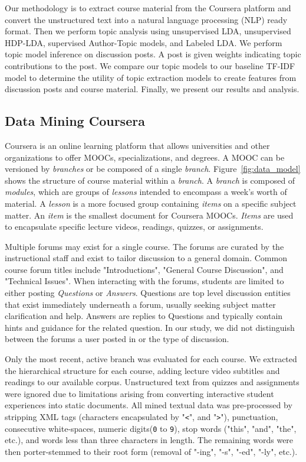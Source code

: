 \documentclass[sigconf, nonacm=true]{acmart}
\begin{document}
Our methodology is to extract course material from the Coursera platform and convert the unstructured text into a natural language processing (NLP) ready format.
Then we perform topic analysis using unsupervised LDA, unsupervised HDP-LDA, supervised Author-Topic models, and Labeled LDA.
We perform topic model inference on discussion posts. A post is given weights indicating topic contributions to the post.
We compare our topic models to our baseline TF-IDF model to determine the utility of topic extraction models to create features from discussion posts and course material.
Finally, we present our results and analysis.

\subsection{Data Mining Coursera}
Coursera is an online learning platform that allows universities and other organizations to offer MOOCs, specializations, and degrees.
A MOOC can be versioned by \textit{branches} or be composed of a single \textit{branch}.
Figure~\ref{fig:data_model} shows the structure of course material within a \textit{branch}.
A \textit{branch} is composed of \textit{modules}, which are groups of \textit{lessons} intended to encompass a week's worth of material.
A \textit{lesson} is a more focused group containing \textit{items} on a specific subject matter.
An \textit{item} is the smallest document for Coursera MOOCs. \textit{Items} are used to encapsulate specific lecture videos, readings, quizzes, or assignments.

Multiple forums may exist for a single course.
The forums are curated by the instructional staff and exist to tailor discussion to a general domain.
Common course forum titles include "Introductions", "General Course Discussion", and "Technical Issues".
When interacting with the forums, students are limited to either posting \textit{Questions} or \textit{Answers}.
Questions are top level discussion entities that exist immediately underneath a forum, usually seeking subject matter clarification and help.
Answers are replies to Questions and typically contain hints and guidance for the related question.
In our study, we did not distinguish between the forums a user posted in or the type of discussion.

Only the most recent, active branch was evaluated for each course.
We extracted the hierarchical structure for each course, adding lecture video subtitles and readings to our available corpus.
Unstructured text from quizzes and assignments were ignored due to limitations arising from converting interactive student experiences into static documents.
All mined textual data was pre-processed by stripping XML tags (characters encapsulated by "\texttt{<}", and "\texttt{>}"), punctuation, consecutive white-spaces, numeric digits(\texttt{0} to \texttt{9}), stop words ("this", "and", "the", etc.), and words less than three characters in length.
The remaining words were then porter-stemmed to their root form (removal of "-ing", "-s", "-ed", "-ly", etc.).
\end{document}
